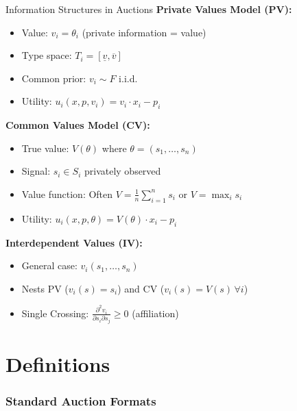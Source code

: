 \documentclass[xcolor={x11names}]{beamer}
\begin{document}
\begin{frame}{Information Structures in Auctions}
\textbf{Private Values Model (PV):}
\begin{itemize}
  \item Value: $v_i = \theta_i$ (private information = value)
  \item Type space: $T_i = [\underline{v}, \overline{v}]$
  \item Common prior: $v_i \sim F$ i.i.d.
  \item Utility: $u_i(x, p, v_i) = v_i \cdot x_i - p_i$
\end{itemize}

\textbf{Common Values Model (CV):}
\begin{itemize}
  \item True value: $V(\theta)$ where $\theta = (s_1, \ldots, s_n)$
  \item Signal: $s_i \in S_i$ privately observed
  \item Value function: Often $V = \frac{1}{n}\sum_{i=1}^n s_i$ or $V = \max_i s_i$
  \item Utility: $u_i(x, p, \theta) = V(\theta) \cdot x_i - p_i$
\end{itemize}

\textbf{Interdependent Values (IV):}
\begin{itemize}
  \item General case: $v_i(s_1, \ldots, s_n)$
  \item Nests PV ($v_i(s) = s_i$) and CV ($v_i(s) = V(s) \, \forall i$)
  \item Single Crossing: $\frac{\partial^2 v_i}{\partial s_i \partial s_j} \geq 0$ (affiliation)
\end{itemize}
\end{frame}


\part{Definitions}

\section{Standard Auction Formats}
\end{document}
